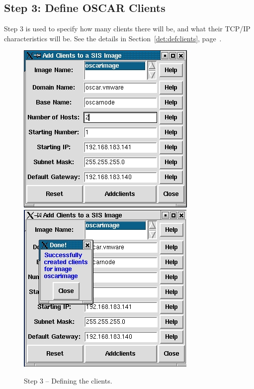 
\clearpage
\subsection{Step 3: Define OSCAR Clients}

Step 3 is used to specify how many clients there will be, and what
their TCP/IP characteristics will be.  See the details in
Section~\ref{det:defclients}, page~\pageref{det:defclients}.
 
\begin{figure}[ht!]
  \begin{center}
    \centerline{
      \includegraphics[scale=\imgscale]{figs/5a_sbs-define-clients1}
      \hspace{\imghskip}
      \includegraphics[scale=\imgscale]{figs/5b_sbs-define-clients2}
      }
    \caption{Step 3 -- Defining the clients.}
    \label{fig:sbs-define-clients}
  \end{center}
\end{figure}


